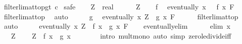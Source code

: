 \begin{isabellebody}
%
\isatagproof
{}\isamarkupfalse%
\ filterlim{\isacharunderscore}{\kern0pt}at{\isacharunderscore}{\kern0pt}top{\isacharunderscore}{\kern0pt}gt{\isacharbrackleft}{\kern0pt}\ c{\isacharequal}{\kern0pt}{}{\isacharbrackright}{\kern0pt}\isanewline
{}\isamarkupfalse%
\ safe\isanewline
\ \ \isamarkupfalse%
\ Z\ {\isacharcolon}{\kern0pt}{\isacharcolon}{\kern0pt}\ real\isanewline
\ \ \isamarkupfalse%
\ {\isachardoublequoteopen}{}\ {\isacharless}{\kern0pt}\ Z{\isachardoublequoteclose}\isanewline
\ \ \isamarkupfalse%
\ f\ \isamarkupfalse%
\ {\isachardoublequoteopen}eventually\ {\isacharparenleft}{\kern0pt}{\isasymlambda}x{\isachardot}{\kern0pt}\ {}\ {\isasymle}\ f\ x{\isacharparenright}{\kern0pt}\ F{\isachardoublequoteclose}\isanewline
\ \ \ \ \isamarkupfalse%
\ filterlim{\isacharunderscore}{\kern0pt}at{\isacharunderscore}{\kern0pt}top\ \isamarkupfalse%
\ auto\isanewline
\ \ \isamarkupfalse%
\ \isamarkupfalse%
\ g\ \isamarkupfalse%
\ {\isachardoublequoteopen}eventually\ {\isacharparenleft}{\kern0pt}{\isasymlambda}x{\isachardot}{\kern0pt}\ Z\ {\isasymle}\ g\ x{\isacharparenright}{\kern0pt}\ F{\isachardoublequoteclose}\isanewline
\ \ \ \ \isamarkupfalse%
\ filterlim{\isacharunderscore}{\kern0pt}at{\isacharunderscore}{\kern0pt}top\ \isamarkupfalse%
\ auto\isanewline
\ \ \isamarkupfalse%
\ \isamarkupfalse%
\ {\isachardoublequoteopen}eventually\ {\isacharparenleft}{\kern0pt}{\isasymlambda}x{\isachardot}{\kern0pt}\ Z\ {\isasymle}\ f\ x\ {\isacharasterisk}{\kern0pt}\ g\ x{\isacharparenright}{\kern0pt}\ F{\isachardoublequoteclose}\isanewline
\ \ \isamarkupfalse%
\ eventually{\isacharunderscore}{\kern0pt}elim\isanewline
\ \ \ \ \isamarkupfalse%
\ {\isacharparenleft}{\kern0pt}elim\ x{\isacharparenright}{\kern0pt}\isanewline
\ \ \ \ \isamarkupfalse%
\ {\isacartoucheopen}{}\ {\isacharless}{\kern0pt}\ Z{\isacartoucheclose}\ \isamarkupfalse%
\ {\isachardoublequoteopen}{}\ {\isacharasterisk}{\kern0pt}\ Z\ {\isasymle}\ f\ x\ {\isacharasterisk}{\kern0pt}\ g\ x{\isachardoublequoteclose}\isanewline
\ \ \ \ \ \ \isamarkupfalse%
\ {\isacharparenleft}{\kern0pt}intro\ mult{\isacharunderscore}{\kern0pt}mono{\isacharparenright}{\kern0pt}\ {\isacharparenleft}{\kern0pt}auto\ simp{\isacharcolon}{\kern0pt}\ zero{\isacharunderscore}{\kern0pt}le{\isacharunderscore}{\kern0pt}divide{\isacharunderscore}{\kern0pt}iff{\isacharparenright}{\kern0pt}\isanewline

\end{isabellebody}
